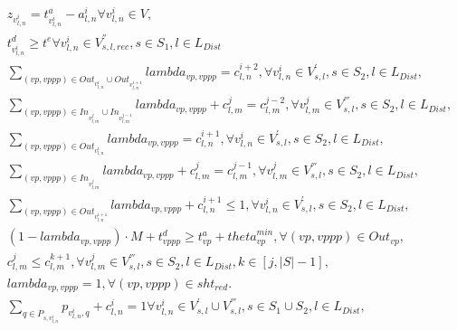 \begin{align}
  & z_{v_{l , n}^{i}} = t_{v_{l , n}^{i}}^{a} - a_{l , n}^{i} \forall v_{l , n}^{i} \in V , \tag{eq\_0021} \\
  & t_{v_{l , n}^{i}}^{d} \geq t^{e} \forall v_{l , n}^{i} \in V_{s , l , \mathit{rec}}^{''} , s \in S_{1} , l \in L_{\mathit{Dist}} \tag{eq\_0022} \\
  & \underset{\left(vp , vppp\right) \in \mathit{Out}_{v_{l , n}^{i}} \cup \mathit{Out}_{v_{l , n}^{i + 1}}}{\sum} \mathit{lambda}_{vp , vppp} = c_{l , n}^{i + 2} , \forall v_{l , n}^{i} \in V_{s , l}^{'} , s \in S_{2} , l \in L_{\mathit{Dist}} , \tag{eq\_0023} \\
  & \underset{\left(vp , vppp\right) \in \mathit{In}_{v_{l , m}^{j}} \cup \mathit{In}_{v_{l , m}^{j - 1}}}{\sum} \mathit{lambda}_{vp , vppp} + c_{l , m}^{j} = c_{l , m}^{j - 2} , \forall v_{l , m}^{j} \in V_{s , l}^{'''} , s \in S_{2} , l \in L_{\mathit{Dist}} , \tag{eq\_0024} \\
  & \underset{\left(vp , vppp\right) \in \mathit{Out}_{v_{l , n}^{i}}}{\sum} \mathit{lambda}_{vp , vppp} = c_{l , n}^{i + 1} , \forall v_{l , n}^{i} \in V_{s , l}^{'} , s \in S_{2} , l \in L_{\mathit{Dist}} , \tag{eq\_0025} \\
  & \underset{\left(vp , vppp\right) \in \mathit{In}_{v_{l , m}^{j}}}{\sum} \mathit{lambda}_{vp , vppp} + c_{l , m}^{j} = c_{l , m}^{j - 1} , \forall v_{l , m}^{j} \in V_{s , l}^{'''} , s \in S_{2} , l \in L_{\mathit{Dist}} , \tag{eq\_0026} \\
  & \underset{\left(vp , vppp\right) \in \mathit{Out}_{v_{l , n}^{i + 1}}}{\sum} \mathit{lambda}_{vp , vppp} + c_{l , n}^{i + 1} \leq 1 , \forall v_{l , n}^{i} \in V_{s , l}^{'} , s \in S_{2} , l \in L_{\mathit{Dist}} , \tag{eq\_0027} \\
  & \left(1 - \mathit{lambda}_{vp , vppp}\right) \cdot M + t_{vppp}^{d} \geq t_{vp}^{a} + \mathit{theta}_{vp}^{\mathit{min}} , \forall \left(vp , vppp\right) \in \mathit{Out}_{vp} , \tag{eq\_0028} \\
  & c_{l , m}^{j} \leq c_{l , m}^{k + 1} , \forall v_{l , m}^{j} \in V_{s , l}^{'''} , s \in S_{2} , l \in L_{\mathit{Dist}} , k \in \left[j , \left|S\right| - 1\right] , \tag{eq\_0029} \\
  & \mathit{lambda}_{vp , vppp} = 1 , \forall \left(vp , vppp\right) \in \mathit{sht}_{\mathit{red}} . \tag{eq\_0030} \\
  & \underset{q \in P_{s , v_{l , n}^{i}}}{\sum} p_{v_{l , n}^{i} , q} + c_{l , n}^{i} = 1 \forall v_{l , n}^{i} \in V_{s , l}^{'} \cup V_{s , l}^{'''} , s \in S_{1} \cup S_{2} , l \in L_{\mathit{Dist}} , \tag{eq\_0031} \\

\end{align}
